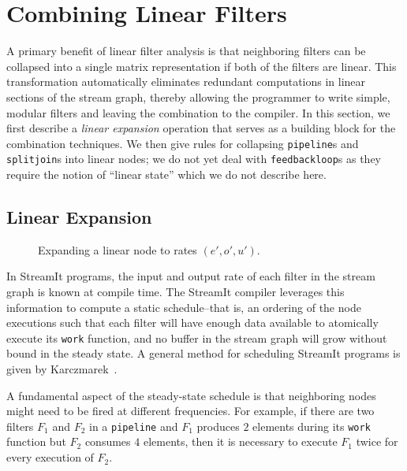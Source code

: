 \section{Combining Linear Filters}
\label{sec:combine}

A primary benefit of linear filter analysis is that neighboring
filters can be collapsed into a single matrix representation if both
of the filters are linear.  This transformation automatically
eliminates redundant computations in linear sections of the stream
graph, thereby allowing the programmer to write simple, modular
filters and leaving the combination to the compiler.  In this section,
we first describe a {\it linear expansion} operation that serves as a
building block for the combination techniques.  We then give rules for
collapsing {\tt pipeline}s and {\tt splitjoin}s into linear nodes; we
do not yet deal with {\tt feedbackloop}s as they require the notion of
``linear state'' which we do not describe here.

\subsection{Linear Expansion}

\begin{figure}[t]
\center
\epsfxsize=3.0in
\vspace{-6pt}
\caption{Expanding a linear node to rates $(e', o', u')$.  }
\label{fig:expanding-a-matrix}
\vspace{-12pt}
\end{figure}

In StreamIt programs, the input and output rate of each filter in the
stream graph is known at compile time.  The StreamIt compiler
leverages this information to compute a static schedule--that is, an
ordering of the node executions such that each filter will have enough
data available to atomically execute its {\tt work} function, and no
buffer in the stream graph will grow without bound in the steady
state.  A general method for scheduling StreamIt programs is given by
Karczmarek~\cite{karczma-thesis}.

A fundamental aspect of the steady-state schedule is that neighboring
nodes might need to be fired at different frequencies.  For example,
if there are two filters $F_1$ and $F_2$ in a {\tt pipeline} and
$F_1$ produces $2$ elements during its {\tt work} function but $F_2$
consumes $4$ elements, then it is necessary to execute $F_1$ twice for
every execution of $F_2$.

